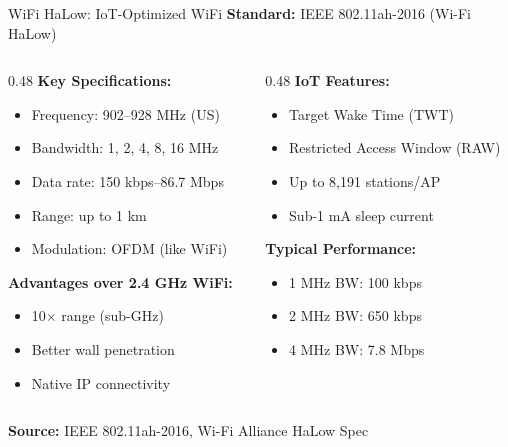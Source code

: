 \documentclass[aspectratio=169,11pt]{beamer}
\begin{document}
\begin{frame}{WiFi HaLow: IoT-Optimized WiFi}
    \textbf{Standard:} IEEE 802.11ah-2016 (Wi-Fi HaLow)
    
    \vspace{0.3cm}
    \begin{columns}[T]
        \begin{column}{0.48\textwidth}
            \textbf{Key Specifications:}
            \begin{itemize}
                \item Frequency: 902--928 MHz (US)
                \item Bandwidth: 1, 2, 4, 8, 16 MHz
                \item Data rate: 150 kbps--86.7 Mbps
                \item Range: up to 1 km
                \item Modulation: OFDM (like WiFi)
            \end{itemize}
            
            \vspace{0.2cm}
            \textbf{Advantages over 2.4 GHz WiFi:}
            \begin{itemize}
                \item 10$\times$ range (sub-GHz)
                \item Better wall penetration
                \item Native IP connectivity
            \end{itemize}
        \end{column}
        \begin{column}{0.48\textwidth}
            \textbf{IoT Features:}
            \begin{itemize}
                \item Target Wake Time (TWT)
                \item Restricted Access Window (RAW)
                \item Up to 8,191 stations/AP
                \item Sub-1 mA sleep current
            \end{itemize}
            
            \vspace{0.2cm}
            \textbf{Typical Performance:}
            \begin{itemize}
                \item 1 MHz BW: 100 kbps
                \item 2 MHz BW: 650 kbps
                \item 4 MHz BW: 7.8 Mbps
            \end{itemize}
        \end{column}
    \end{columns}
    
    \vspace{0.2cm}
    \textbf{Source:} IEEE 802.11ah-2016, Wi-Fi Alliance HaLow Spec
\end{frame}
\end{document}
